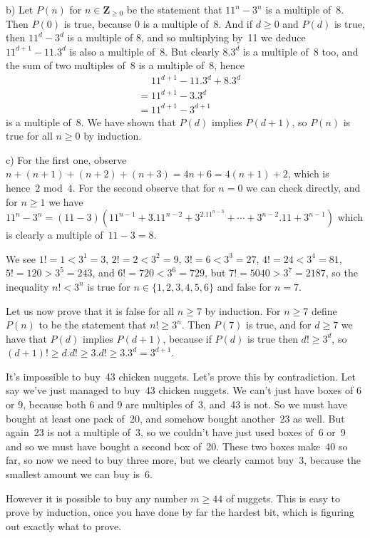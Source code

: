\documentclass[10pt]{article}
\newcommand{\Z}{\mathbf{Z}}
\begin{document}
b) Let $P(n)$ for $n\in\Z_{\geq0}$ be the statement that $11^n-3^n$ is a multiple of~8. Then $P(0)$ is true, because 0 is a multiple of~8. And if $d\geq0$ and $P(d)$ is true, then $11^d-3^d$ is a multiple of 8, and so multiplying by~11 we deduce $11^{d+1}-11.3^d$ is also a multiple of~8. But clearly $8.3^d$ is a multiple of~8 too, and the sum of two multiples of~8 is a multiple of~8, hence
\begin{align*}
&\phantom{=}11^{d+1}-11.3^d+8.3^d\\
&=11^{d+1}-3.3^d\\
&=11^{d+1}-3^{d+1}
\end{align*}
is a multiple of~8. We have shown that $P(d)$ implies $P(d+1)$, so $P(n)$ is true for all $n\geq0$ by induction.

c) For the first one, observe $n+(n+1)+(n+2)+(n+3)=4n+6=4(n+1)+2$, which is hence~2 mod~4. For the second observe that for $n=0$ we can check directly, and for $n\geq1$ we have $11^n-3^n=(11-3)(11^{n-1}+3.11^{n-2}+3^2.11^{n-3}+\cdots+3^{n-2}.11+3^{n-1})$ which is clearly a multiple of~$11-3=8$.

\medskip{} We see $1!=1<3^1=3$, $2!=2<3^2=9$, $3!=6<3^3=27$, $4!=24<3^4=81$, $5!=120>3^5=243$, and $6!=720<3^6=729$, but $7!=5040>3^7=2187$, so the inequality $n!<3^n$ is true for $n\in\{1,2,3,4,5,6\}$ and false for $n=7$.

Let us now prove that it is false for all $n\geq7$ by induction. For $n\geq7$ define $P(n)$ to be the statement that $n!\geq 3^n$. Then $P(7)$ is true, and for $d\geq7$ we have that $P(d)$ implies $P(d+1)$, because if $P(d)$ is true then $d!\geq 3^d$, so $(d+1)!\geq d.d!\geq 3.d!\geq 3.3^d=3^{d+1}$. 

\medskip{} It's impossible to buy~43 chicken nuggets. Let's prove this by contradiction. Let say we've just managed to buy~43 chicken nuggets. We can't just have boxes of 6 or 9, because both 6 and 9 are multiples of~3, and~43 is not. So we must have bought at least one pack of~20, and somehow bought another~23 as well. But again~23 is not a multiple of~3, so we couldn't have just used boxes of~6 or~9 and so we must have bought a second box of~20. These two boxes make~40 so far, so now we need to buy three more, but we clearly cannot buy~3, because the smallest amount we can buy is~6.

However it is possible to buy any number $m\geq44$ of nuggets. This is easy to prove by induction, once you have done by far the hardest bit, which is figuring out exactly what to prove.
\end{document}
